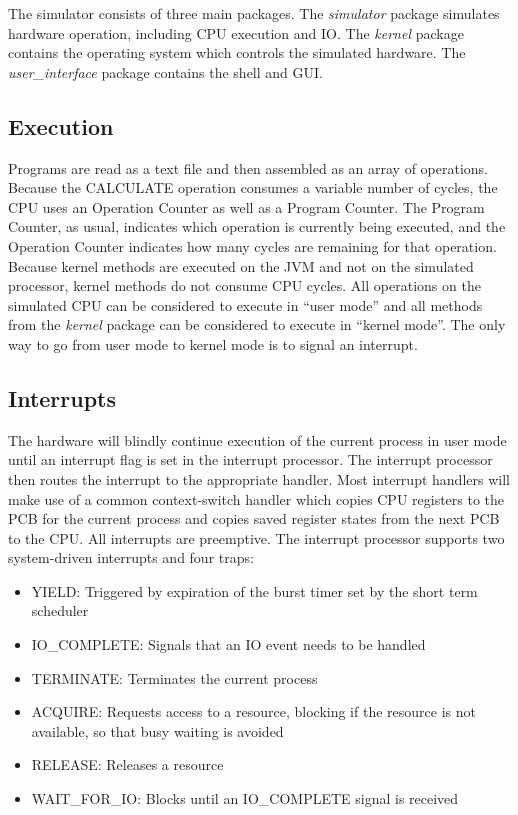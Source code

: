 \documentclass[paper=a4, fontsize=11pt]{scrartcl} %
\numberwithin{equation}{section} %
\numberwithin{figure}{section} %
\numberwithin{table}{section} %
\begin{document}
The simulator consists of three main packages. The \textit{simulator} package simulates hardware operation, including CPU execution and IO. The \textit{kernel} package contains the operating system which controls the simulated hardware. The \textit{user\_interface} package contains the shell and GUI.

\subsection{Execution}
Programs are read as a text file and then assembled as an array of operations. Because the CALCULATE operation consumes a variable number of cycles, the CPU uses an Operation Counter as well as a Program Counter. The Program Counter, as usual, indicates which operation is currently being executed, and the Operation Counter indicates how many cycles are remaining for that operation.
Because kernel methods are executed on the JVM and not on the simulated processor, kernel methods do not consume CPU cycles. All operations on the simulated CPU can be considered to execute in ``user mode'' and all methods from the \textit{kernel} package can be considered to execute in ``kernel mode''. The only way to go from user mode to kernel mode is to signal an interrupt.

\subsection{Interrupts}

The hardware will blindly continue execution of the current process in user mode until an interrupt flag is set in the interrupt processor. The interrupt processor then routes the interrupt to the appropriate handler. Most interrupt handlers will make use of a common context-switch handler which copies CPU registers to the PCB for the current process and copies saved register states from the next PCB to the CPU. All interrupts are preemptive. The interrupt processor supports two system-driven interrupts and four traps:


\begin{itemize}
	\item YIELD: Triggered by expiration of the burst timer set by the short term scheduler
          \item IO\_COMPLETE: Signals that an IO event needs to be handled
           \item TERMINATE: Terminates the current process
	\item ACQUIRE: Requests access to a resource, blocking if the resource is not available, so that busy waiting is avoided
	\item RELEASE: Releases a resource
	\item WAIT\_FOR\_IO: Blocks until an IO\_COMPLETE signal is received
\end{itemize}
\end{document}
